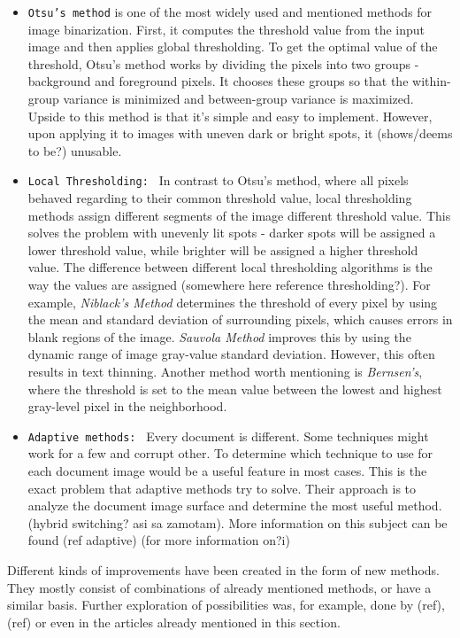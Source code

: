 \begin{itemize}
\item\texttt{Otsu's method} is one of the most widely used and mentioned methods for image binarization. First, it computes the threshold value from the input image and then applies global thresholding. To get the optimal value of the threshold, Otsu's method works by dividing the pixels into two groups - background and foreground pixels. It chooses these groups so that the within-group variance is minimized and between-group variance is maximized. Upside to this method is that it's simple and easy to implement. However, upon applying it to images with uneven dark or bright spots, it (shows/deems to be?) unusable.

\item\texttt{Local Thresholding: } In contrast to Otsu's method, where all pixels behaved regarding to their common threshold value, local thresholding methods assign different segments of the image different threshold value. This solves the problem with unevenly lit spots - darker spots will be assigned a lower threshold value, while brighter will be assigned a higher threshold value. The difference between different local thresholding algorithms is the way the values are assigned (somewhere here reference thresholding?). For example, \emph{Niblack's Method} determines the threshold of every pixel by using the mean and standard deviation of surrounding pixels, which causes errors in blank regions of the image. \emph{Sauvola Method} improves this by using the dynamic range of image gray-value standard deviation. However, this often results in text thinning. Another method worth mentioning is \emph{Bernsen's}, where the threshold is set to the mean value between the lowest and highest gray-level pixel in the neighborhood.

\item\texttt{Adaptive methods: } Every document is different. Some techniques might work for a few and corrupt other. To determine which technique to use for each document image would be a useful feature in most cases. This is the exact problem that adaptive methods try to solve. Their approach is to analyze the document image surface and determine the most useful method. (hybrid switching? asi sa zamotam). More information on this subject can be found (ref adaptive) (for more information on?i)

\end{itemize}

Different kinds of improvements have been created in the form of new methods. They mostly consist of combinations of already mentioned methods, or have a similar basis. Further exploration of possibilities was, for example, done by (ref), (ref) or even in the articles already mentioned in this section.


